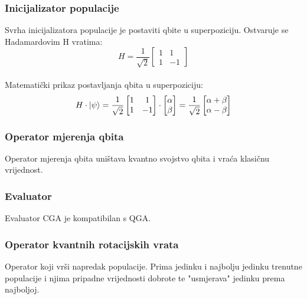 \documentclass[times, utf8, zavrsni]{fer}
\begin{document}
\subsubsection{Inicijalizator populacije}
Svrha inicijalizatora populacije je postaviti qbite u superpoziciju. Ostvaruje se Hadamardovim H vratima:
\begin{equation}
H = \frac{1}{\sqrt{2}}
\begin{bmatrix}
1 & 1 \\ 1 & -1
\end{bmatrix} 
\end{equation}

\paragraph{}
Matematički prikaz postavljanja qbita u superpoziciju:
\begin{equation}
H\cdot \ket{\psi} = \frac{1}{\sqrt{2}}
\begin{bmatrix}
1 & 1 \\ 1 & -1
\end{bmatrix} \cdot
\begin{bmatrix}
\alpha \\ \beta
\end{bmatrix}
 = \frac{1}{\sqrt{2}}
\begin{bmatrix}
\alpha + \beta \\ \alpha - \beta
\end{bmatrix}
\end{equation}

\subsubsection{Operator mjerenja qbita}
Operator mjerenja qbita uništava kvantno svojstvo qbita i vraća klasičnu vrijednost. 

\subsubsection{Evaluator}
Evaluator CGA je kompatibilan s QGA.
\subsubsection{Operator kvantnih rotacijskih vrata}
Operator koji vrši napredak populacije. Prima jedinku i najbolju jedinku trenutne populacije i njima pripadne vrijednosti dobrote te "usmjerava" jedinku prema najboljoj.
\end{document}
